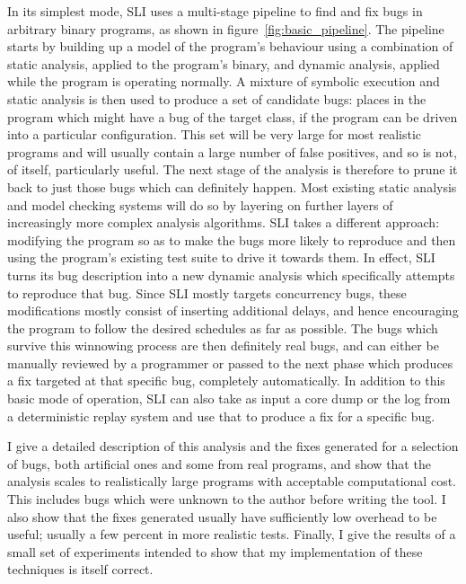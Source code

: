 In its simplest mode, SLI uses a multi-stage pipeline to find and fix
bugs in arbitrary binary programs, as shown in
figure~\ref{fig:basic_pipeline}.  The pipeline starts by building up a
model of the program's behaviour using a combination of static
analysis, applied to the program's binary, and dynamic analysis,
applied while the program is operating normally.  A mixture of
symbolic execution and static analysis is then used to produce a set
of candidate bugs: places in the program which might have a bug of the
target class, if the program can be driven into a particular
configuration.  This set will be very large for most realistic
programs and will usually contain a large number of false positives,
and so is not, of itself, particularly useful.  The next stage of the
analysis is therefore to prune it back to just those bugs which can
definitely happen.  Most existing static analysis and model checking
systems will do so by layering on further layers of increasingly more
complex analysis algorithms.  SLI takes a different approach:
modifying the program so as to make the bugs more likely to reproduce
and then using the program's existing test suite to drive it towards
them.  In effect, SLI turns its bug description into a new dynamic
analysis which specifically attempts to reproduce that bug.  Since SLI
mostly targets concurrency bugs, these modifications mostly consist of
inserting additional delays, and hence encouraging the program to
follow the desired schedules as far as possible.  The bugs which
survive this winnowing process are then definitely real bugs, and can
either be manually reviewed by a programmer or passed to the next
phase which produces a fix targeted at that specific bug, completely
automatically.  In addition to this basic mode of operation, SLI can
also take as input a core dump or the log from a deterministic replay
system and use that to produce a fix for a specific bug.

I give a detailed description of this analysis and the fixes generated
for a selection of bugs, both artificial ones and some from real
programs, and show that the analysis scales to realistically large
programs with acceptable computational cost.  This includes bugs which
were unknown to the author before writing the tool.  I also show
that the fixes generated usually have sufficiently low overhead to be
useful; usually a few percent in more realistic tests.  Finally, I
give the results of a small set of experiments intended to show that
my implementation of these techniques is itself correct.

